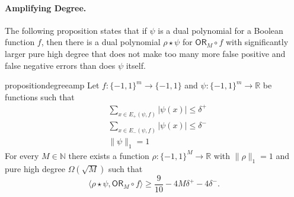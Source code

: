 \documentclass[11pt, letterpaper, fleqn]{article}
\theoremstyle{plain}
\newcommand{\R}{\mathbb{R}}
\newcommand{\OR}{\mathsf{ OR}}
\newcommand{\bits}{\{-1,1\}}
\newcommand{\ls}{\star}
\newcommand{\N}{\mathbb{N}}
\begin{document}
\paragraph{Amplifying Degree.}

The following proposition states that if $\psi$ is a dual polynomial for a Boolean function $f$,
then there is a dual polynomial $\rho \ls \psi$ for $\OR_M \circ f$
with significantly larger pure high degree that does not make too many
more false positive and false negative errors than does $\psi$ itself.

\begin{restatable}{proposition}{degreeamp} \label{prop:degree-amp}
Let $f : \bits^m \to \bits$ and $\psi : \bits^m \to \R$ be functions such that
\begin{align} & \sum_{x \in E_+(\psi, f)} |\psi(x)| \le \delta^+ \label{eqn:deg-base-pos} \\
& \sum_{x \in E_-(\psi, f)} |\psi(x)| \le \delta^- \label{eqn:deg-base-neg} \\
& \|\psi\|_1 = 1 \label{eqn:deg-base-norm}
\end{align}
For every $M \in \N$ there exists a function $\rho : \bits^M \to \R$ with $\|\rho\|_1 = 1$ and pure high degree $\Omega(\sqrt{M})$ such that
\begin{equation}
\langle \rho \ls \psi, \OR_M \circ f \rangle \ge \frac{9}{10} - 4  M \delta^+ - 4\delta^-. \label{eqn:deg-amp-corr}
\end{equation}
\end{restatable}
\end{document}
